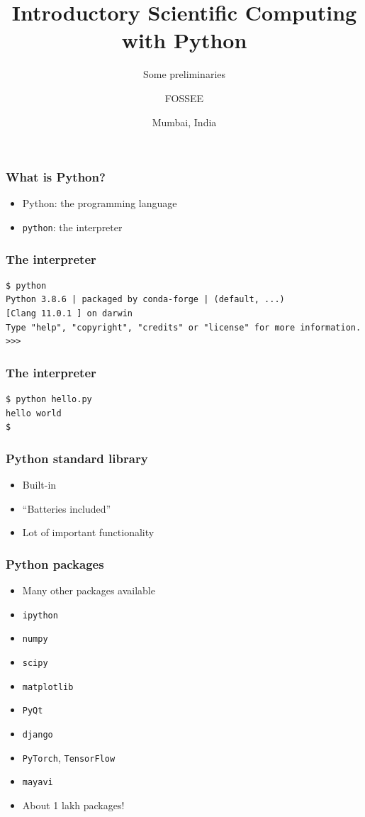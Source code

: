 \documentclass[14pt,compress]{beamer}
\title[Preliminaries]{Introductory Scientific Computing with
Python}
\subtitle{Some preliminaries}
\author[FOSSEE] {FOSSEE}
\institute[IIT Bombay] {Department of Aerospace Engineering\\IIT Bombay}
\date[] {Mumbai, India
}
\newcommand{\typ}[1]{\lstinline{#1}}
\begin{document}
\begin{frame}
  \maketitle
\end{frame}

\begin{frame}[plain]
  \frametitle{What is Python?}
  \large
  \begin{itemize}
  \item Python: the programming language

    \vspace*{0.5in}
  \item \typ{python}: the interpreter
  \end{itemize}
\end{frame}

\begin{frame}[fragile]
  \frametitle{The interpreter}
  \footnotesize
  \begin{lstlisting}
$ python
Python 3.8.6 | packaged by conda-forge | (default, ...)
[Clang 11.0.1 ] on darwin
Type "help", "copyright", "credits" or "license" for more information.
>>>
\end{lstlisting} %
\end{frame}

\begin{frame}[fragile]
  \frametitle{The interpreter}
  \small
\begin{lstlisting}
$ python hello.py
hello world
$
\end{lstlisting}
\end{frame}

\begin{frame}[plain]
  \frametitle{Python standard library}
  \begin{itemize}
  \item Built-in
  \item ``Batteries included''
  \item Lot of important functionality
  \end{itemize}
\end{frame}

\begin{frame}[plain]
  \frametitle{Python packages}
  \begin{itemize}
  \item Many other packages available
  \item \typ{ipython}
  \item \typ{numpy}
  \item \typ{scipy}
  \item \typ{matplotlib}
  \item \typ{PyQt}
  \item \typ{django}
  \item \typ{PyTorch}, \typ{TensorFlow}
  \item \typ{mayavi}
  \item About 1 lakh packages!
  \end{itemize}
\end{frame}
\end{document}
